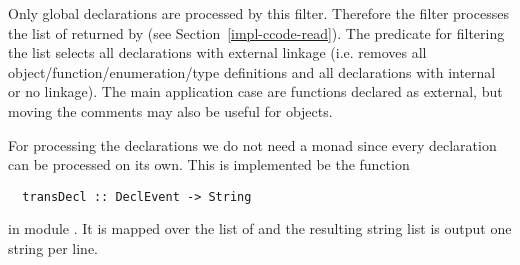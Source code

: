 Only global declarations are processed by this filter. Therefore the filter processes the list of 
returned by  (see Section~\ref{impl-ccode-read}). The predicate for filtering the list
selects all declarations with external linkage (i.e. removes all object/function/enumeration/type definitions and 
all declarations with internal or no linkage). 
The main application case are functions declared as external, but moving the comments may also be useful for 
objects.

For processing the declarations we do not need a monad since every declaration can be processed on its own. This is implemented
be the function
\begin{verbatim}
  transDecl :: DeclEvent -> String
\end{verbatim}
in module . It is mapped over the list of  and the resulting string list
is output one string per line.
